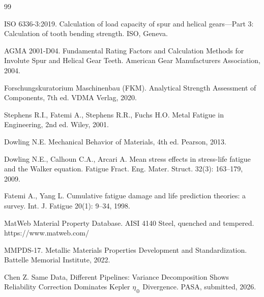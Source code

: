 \documentclass[12pt,a4paper]{article}
\begin{document}
\begin{thebibliography}{99}

ISO 6336-3:2019. Calculation of load capacity of spur and helical
gears---Part 3: Calculation of tooth bending strength. ISO, Geneva.

AGMA 2001-D04. Fundamental Rating Factors and Calculation Methods for
Involute Spur and Helical Gear Teeth. American Gear Manufacturers
Association, 2004.

Forschungskuratorium Maschinenbau (FKM). Analytical Strength Assessment
of Components, 7th ed. VDMA Verlag, 2020.

Stephens R.I., Fatemi A., Stephens R.R., Fuchs H.O. Metal Fatigue in
Engineering, 2nd ed. Wiley, 2001.

Dowling N.E. Mechanical Behavior of Materials, 4th ed. Pearson, 2013.

Dowling N.E., Calhoun C.A., Arcari A. Mean stress effects in
stress-life fatigue and the Walker equation. Fatigue Fract. Eng. Mater.
Struct. 32(3): 163--179, 2009.

Fatemi A., Yang L. Cumulative fatigue damage and life prediction
theories: a survey. Int. J. Fatigue 20(1): 9--34, 1998.

MatWeb Material Property Database. AISI 4140 Steel, quenched and
tempered. https://www.matweb.com/

MMPDS-17. Metallic Materials Properties Development and Standardization.
Battelle Memorial Institute, 2022.

Chen Z. Same Data, Different Pipelines: Variance Decomposition Shows
Reliability Correction Dominates Kepler $\eta_\oplus$ Divergence.
PASA, submitted, 2026.

\end{thebibliography}
\end{document}

